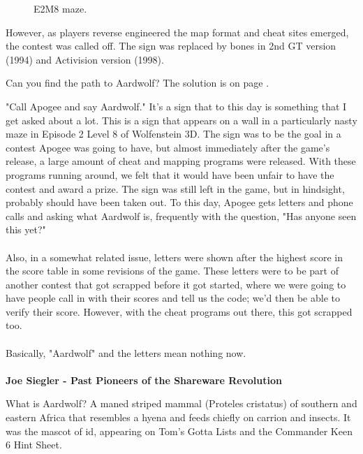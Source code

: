 \begin{figure}[H]
  \centering
 \caption{E2M8 maze.}
\end{figure}
\par
\begin{figure}
\vspace{-10pt}
\end{figure}
However, as players reverse engineered the map format and cheat sites emerged, the contest was called off. The sign was replaced by bones in 2nd GT version (1994) and Activision version (1998).\\
\par
Can you find the path to Aardwolf? The solution is on page \pageref{aardwold_solution}. \\
\begin{fancyquotes}
"Call Apogee and say Aardwolf."  It's a sign that to this day is something
that I get asked about a lot.  This is a sign that appears on a wall in a
particularly nasty maze in Episode 2 Level 8 of Wolfenstein 3D.  The sign
was to be the goal in a contest Apogee was going to have, but almost
immediately after the game's release, a large amount of cheat and mapping
programs were released.  With these programs running around, we felt that
it would have been unfair to have the contest and award a prize.  The sign
was still left in the game, but in hindsight, probably should have been
taken out.  To this day, Apogee gets letters and phone calls and asking
what Aardwolf is, frequently with the question, "Has anyone seen this yet?"\\
\\
Also, in a somewhat related issue, letters were shown after the highest score
in the score table in some revisions of the game.  These letters were to be
part of another contest that got scrapped before it got started, where we were
going to have people call in with their scores and tell us the code; we'd then
be able to verify their score.  However, with the cheat programs out there,
this got scrapped too.\\
\\
Basically, "Aardwolf" and the letters mean nothing now.\\
\\
\textbf{Joe Siegler - Past Pioneers of the Shareware Revolution}
\end{fancyquotes}
\par
\bigskip
{} What is Aardwolf? A maned striped mammal (Proteles cristatus) of southern and eastern Africa that resembles a hyena and feeds chiefly on carrion and insects. It was the mascot of id, appearing on Tom's Gotta Lists and the Commander Keen 6 Hint Sheet.\\
\par

